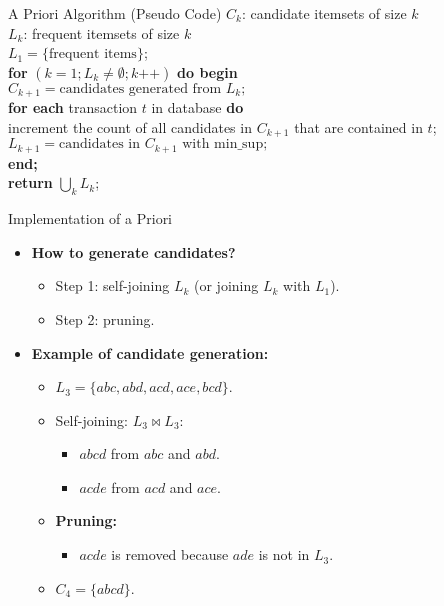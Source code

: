 \begin{frame}{A Priori Algorithm (Pseudo Code)}
	$C_k$: candidate itemsets of size $k$\\
	$L_k$: frequent itemsets of size $k$\\[0.5cm]
	
	$L_1 = \{\text{frequent items}\}$;\\[0.5cm]
	\textbf{for} $(k=1; L_k \neq \emptyset; k\texttt{++})$ \textbf{do begin}\\
	\hspace{1cm} $C_{k+1} = \text{candidates generated from } L_k;$\\
	\hspace{1cm} \textbf{for each} transaction $t$ in database \textbf{do}\\
	\hspace{2cm} increment the count of all candidates in $C_{k+1}$ that are 
	contained in $t$;\\[0.1cm]
	\hspace{1cm}$L_{k+1} = \text{candidates in } C_{k+1} \text{ with 
	min\_sup};$\\
	\textbf{end;}\\[0.1cm]
	\textbf{return} $\bigcup_k L_k$;
\end{frame}

\begin{frame}{Implementation of a Priori}
	\begin{itemize}
		\item \textbf{\color{airforceblue}How to generate candidates?}
		\begin{itemize}
			\item Step 1: self-joining $L_k$ (or joining $L_k$ with $L_1$).
			\item Step 2: pruning.
		\end{itemize}
		\item \textbf{Example of candidate generation:}
		\begin{itemize}
			\item $L_3 = \{abc, abd, acd, ace, bcd\}$.
			\item Self-joining: $L_3 \bowtie L_3$:
			\begin{itemize}
				\item $abcd$ from $abc$ and $abd$.
				\item $acde$ from $acd$ and $ace$.
			\end{itemize}
			\item \textbf{Pruning:}
			\begin{itemize}
				\item $acde$ is removed because $ade$ is not in $L_3$.
			\end{itemize}
			\item $C_4 = \{abcd\}$.
		\end{itemize}
	\end{itemize}
\end{frame}

